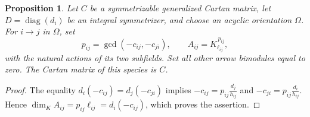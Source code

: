 \documentclass[11pt, reqno]{amsart}
\numberwithin{equation}{section}
\newtheorem{proposition}[theorem]{Proposition}
\theoremstyle{definition}
\theoremstyle{remark}
\newcommand{\op}[1]{\operatorname{#1}}
\begin{document}
\begin{proposition}\label{prop:standard}
Let $C$ be a symmetrizable generalized Cartan matrix, let
$D=\op{diag}(d_i)$ be an integral symmetrizer, and choose an
acyclic orientation $\Omega$. For $i\to j$ in $\Omega$, set
\[ p_{ij}=\gcd(-c_{ij},-c_{ji}),\qquad A_{ij}=K_{\ell_{ij}}^{\,p_{ij}}, \]
with the natural actions of its two subfields. Set all other arrow
bimodules equal to zero. The Cartan matrix of this species is $C$.
\end{proposition}
\begin{proof}
The equality $d_i(-c_{ij})=d_j(-c_{ji})$ implies
$-c_{ij}=p_{ij}\frac{d_j}{h_{ij}}$ and $-c_{ji}=p_{ij}\frac{d_i}{h_{ij}}$.
Hence $\dim_K A_{ij}=p_{ij}\ell_{ij}=d_i(-c_{ij})$, which proves
the assertion.
\end{proof}
\end{document}
